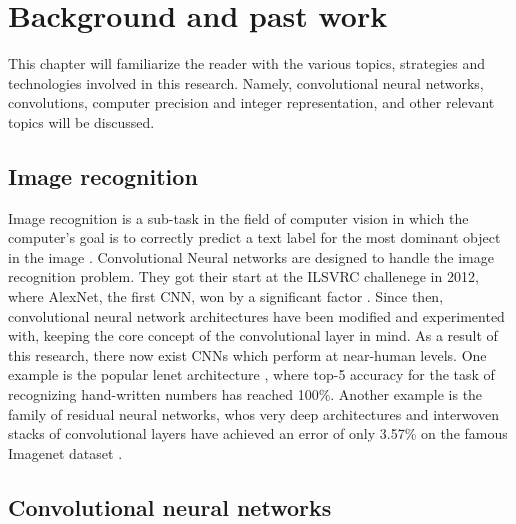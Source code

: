 \chapter{Background and past work}

This chapter will familiarize the reader with the various topics, strategies and technologies involved in this research. Namely, convolutional neural networks, convolutions, computer precision and integer representation, and other relevant topics will be discussed.

\section{Image recognition}
Image recognition is a sub-task in the field of computer vision in which the computer's goal is to correctly predict a text label for the most dominant object in the image \cite{history}. Convolutional Neural networks are designed to handle the image recognition problem. They got their start at the ILSVRC challenege in 2012, where AlexNet, the first CNN, won by a significant factor \cite{history}. Since then, convolutional neural network architectures have been modified and experimented with, keeping the core concept of the convolutional layer in mind. As a result of this research, there now exist CNNs which perform at near-human levels. One example is the popular lenet architecture \cite{mnist}, where top-5 accuracy for the task of recognizing hand-written numbers has reached 100\%. Another example is the family of residual neural networks, whos very deep architectures and interwoven stacks of convolutional layers have achieved an error of only 3.57\% on the famous Imagenet dataset \cite{resnets2}.

\section{Convolutional neural networks}
